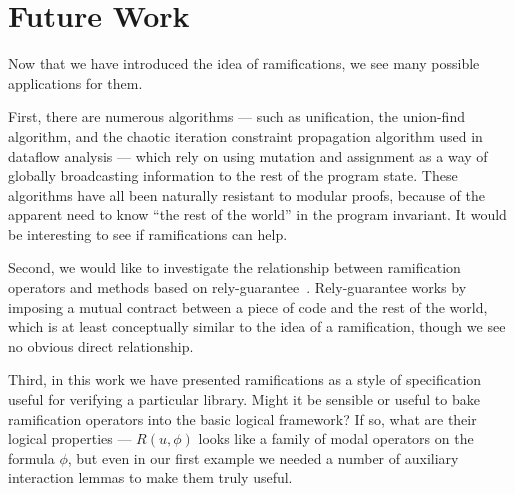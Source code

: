 % 
% 
% 

\section{Future Work}

Now that we have introduced the idea of ramifications, we see many
possible applications for them. 

First, there are numerous algorithms --- such as unification, the
union-find algorithm, and the chaotic iteration constraint propagation
algorithm used in dataflow analysis --- which rely on using mutation
and assignment as a way of globally broadcasting information to the
rest of the program state. These algorithms have all been naturally
resistant to modular proofs, because of the apparent need to know
``the rest of the world'' in the program invariant. It would be
interesting to see if ramifications can help.

Second, we would like to investigate the relationship between
ramification operators and methods based on
rely-guarantee~\cite{rely-guarantee-jones}. Rely-guarantee works by
imposing a mutual contract between a piece of code and the rest of the
world, which is at least conceptually similar to the idea of a
ramification, though we see no obvious direct relationship.

Third, in this work we have presented ramifications as a style of
specification useful for verifying a particular library. Might it be
sensible or useful to bake ramification operators into the basic
logical framework? If so, what are their logical properties --- $R(u,
\phi)$ looks like a family of modal operators on the formula $\phi$, but
even in our first example we needed a number of auxiliary interaction
lemmas to make them truly useful.

